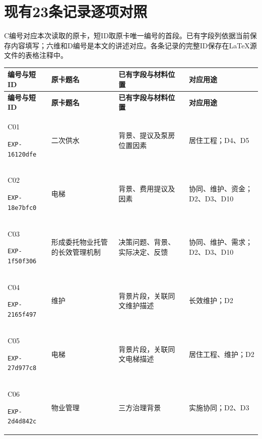 \section{现有23条记录逐项对照}
C编号对应本次读取的原卡，短ID取原卡唯一编号的首段。已有字段列依据当前保存内容填写；六维和D编号是本文的讲述对应。各条记录的完整ID保存在LaTeX源文件的表格注释中。
{\small
\begin{longtable}{@{}L{29mm}L{36mm}L{56mm}L{32mm}@{}}
\toprule
\textbf{编号与短ID} & \textbf{原卡题名} & \textbf{已有字段与材料位置} & \textbf{对应用途}\\
\midrule
\endfirsthead
\toprule
\textbf{编号与短ID} & \textbf{原卡题名} & \textbf{已有字段与材料位置} & \textbf{对应用途}\\
\midrule
\endhead
\hypertarget{EXP-16120dfe-9d94-4394-8880-494b385cf2d2}{C01}\newline\texttt{EXP-16120dfe} & 二次供水 & 背景、提议及泵房位置因素 & 居住工程；D4、D5\\
\hypertarget{EXP-18e7bfc0-c19d-429f-8d76-c7fe1b1b370a}{C02}\newline\texttt{EXP-18e7bfc0} & 电梯 & 背景、费用提议及因素 & 协同、维护、资金；D2、D3、D10\\
\hypertarget{EXP-1f50f306-64e5-4335-be56-5c89531c00f2}{C03}\newline\texttt{EXP-1f50f306} & 形成委托物业托管的长效管理机制 & 决策问题、背景、实际决定、反馈 & 协同、维护、需求；D2、D3、D10\\
\hypertarget{EXP-2165f497-e0b6-4647-832f-5d7dd8835e54}{C04}\newline\texttt{EXP-2165f497} & 维护 & 背景片段，关联同文维护描述 & 长效维护；D2\\
\hypertarget{EXP-27d977c8-68a1-4080-8835-f6d3beb33bd2}{C05}\newline\texttt{EXP-27d977c8} & 电梯 & 背景片段，关联同文电梯描述 & 居住工程、维护；D2\\
\hypertarget{EXP-2d4d842c-d9f9-4eac-ad97-93d8fe87533a}{C06}\newline\texttt{EXP-2d4d842c} & 物业管理 & 三方治理背景 & 实施协同；D2、D3\\

\end{longtable}}

